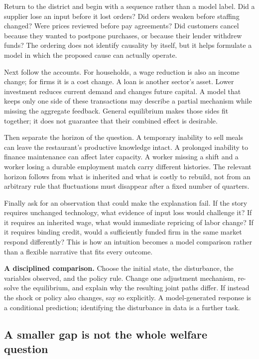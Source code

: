 Return to the district and begin with a sequence rather than a model label.
Did a supplier lose an input before it lost orders? Did orders weaken before
staffing changed? Were prices reviewed before pay agreements? Did customers
cancel because they wanted to postpone purchases, or because their lender
withdrew funds? The ordering does not identify causality by itself, but it
helps formulate a model in which the proposed cause can actually operate.

Next follow the accounts. For households, a wage reduction is also an income
change; for firms it is a cost change. A loan is another sector's asset. Lower
investment reduces current demand and changes future capital. A model that
keeps only one side of these transactions may describe a partial mechanism
while missing the aggregate feedback. General equilibrium makes those sides
fit together; it does not guarantee that their combined effect is desirable.

Then separate the horizon of the question. A temporary inability to sell meals
can leave the restaurant's productive knowledge intact. A prolonged inability
to finance maintenance can affect later capacity. A worker missing a shift and
a worker losing a durable employment match carry different histories. The
relevant horizon follows from what is inherited and what is costly to rebuild,
not from an arbitrary rule that fluctuations must disappear after a fixed
number of quarters.

Finally ask for an observation that could make the explanation fail. If the
story requires unchanged technology, what evidence of input loss would challenge
it? If it requires an inherited wage, what would immediate repricing of labor
change? If it requires binding credit, would a sufficiently funded firm in the
same market respond differently? This is how an intuition becomes a model
comparison rather than a flexible narrative that fits every outcome.

\begin{redblock}
\textbf{A disciplined comparison.}
Choose the initial state, the disturbance, the variables observed, and the
policy rule. Change one adjustment mechanism, re-solve the equilibrium, and
explain why the resulting joint paths differ. If instead the shock or policy
also changes, say so explicitly. A model-generated response is a conditional
prediction; identifying the disturbance in data is a further task.
\end{redblock}

\subsection{A smaller gap is not the whole welfare question}

